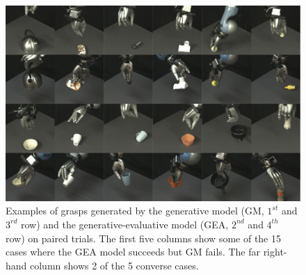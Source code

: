 \begin{figure}
\includegraphics[width=\textwidth]{images/successfailure.pdf}
\caption{Examples of grasps generated by the generative model (GM, $1^{st}$ and $3^{rd}$ row) and the generative-evaluative model (GEA, $2^{nd}$ and $4^{th}$ row) on paired trials. The first five columns show some of the 15 cases where the GEA model succeeds but GM fails. The far right-hand column shows 2 of the 5 converse cases. \label{fig:successfail}}
\end{figure}

%
